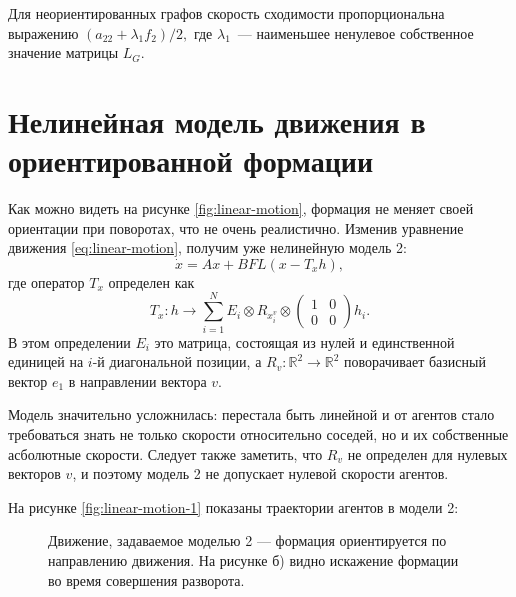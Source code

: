 \begin{theorem}
Для неориентированных графов скорость сходимости пропорциональна выражению 
$(a_22+\lambda_1 f_2)/2,$ где $\lambda_1$~--- наименьшее ненулевое собственное значение матрицы $L_G$.
\end{theorem}

\section{Нелинейная модель движения в ориентированной формации}
Как можно видеть на рисунке \ref{fig:linear-motion}, формация не меняет своей ориентации при поворотах, что не очень реалистично. Изменив уравнение движения \ref{eq:linear-motion}, получим уже нелинейную модель 2:
\begin{equation}
\dot{x}=Ax+BFL(x-T_x h),
\label{eq:orientable-motion}
\end{equation}
где оператор $T_x$ определен как
\begin{equation}
T_x:h\rightarrow \sum^N_{i=1}E_i\otimes R_{x^v_i}\otimes
\left( 
\begin{array}{cc}
1 & 0 \\
0 & 0 \end{array} \right) h_i.
\end{equation}
В этом определении $E_i$ это матрица, состоящая из нулей и единственной единицей на $i$-й диагональной позиции, а $R_v:\mathbb{R}^2\rightarrow\mathbb{R}^2$ поворачивает базисный вектор $e_1$ в направлении вектора $v$.

Модель значительно усложнилась: перестала быть линейной и от агентов стало требоваться знать не только скорости относительно соседей, но и их собственные асболютные скорости. Следует также заметить, что $R_v$ не определен для нулевых векторов $v$, и поэтому модель 2 не допускает нулевой скорости агентов.

На рисунке \ref{fig:linear-motion-1} показаны траектории агентов в модели 2:

\begin{figure}[h]
  \begin{minipage}[h]{0.45\linewidth}
  \end{minipage}
  \hfill
  \begin{minipage}[h]{0.45\linewidth}
  \end{minipage}
  \caption{Движение, задаваемое моделью 2 --- формация ориентируется по направлению движения. На рисунке б) видно искажение формации во время совершения разворота.}
\label{fig:orientable-motion}
\end{figure}

